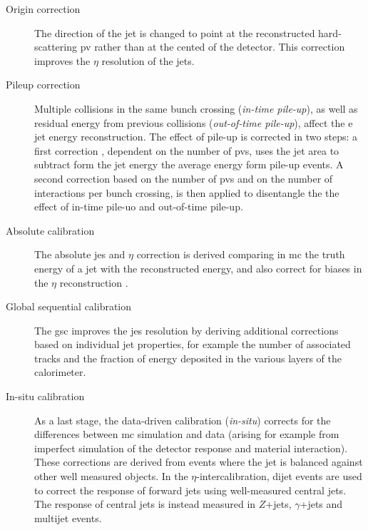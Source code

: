 \begin{description}
\item[Origin correction] The direction of the jet is changed to point at the reconstructed hard-scattering \gls{pv} rather than at the cented of the detector. This correction improves the $\eta$ resolution of the jets.

\item[Pileup correction] Multiple collisions in the same bunch crossing (\textit{in-time pile-up}), as well as residual energy from previous collisions (\textit{out-of-time pile-up}), affect the e jet energy reconstruction. The effect of pile-up is corrected in two steps: a first correction \cite{Cacciari:2007fd,TheATLAScollaboration:2013pia}, dependent on the number of \glspl{pv}, uses the jet area to subtract form the jet energy the average energy form pile-up events. A second correction based on the number of \glspl{pv} and on the number of interactions per bunch crossing, is then applied to disentangle the the effect of in-time pile-uo and out-of-time pile-up.

\item[Absolute calibration] The absolute \gls{jes} and $\eta$ correction is derived comparing in \gls{mc} the truth energy of a jet with the reconstructed energy, and also correct for biases in the $\eta$ reconstruction \cite{Aad2015jets}.

\item[Global sequential calibration] The \gls{gsc} \cite{ATLAS:2015oia} improves the \gls{jes} resolution by deriving additional corrections based on individual jet properties, for example the number of associated tracks and the fraction of energy deposited in the various layers of the calorimeter.

\item[In-situ calibration] As a last stage, the data-driven calibration (\textit{in-situ}) \cite{ATLAS:2015uwa} corrects for the differences between \gls{mc} simulation and data (arising for example from imperfect simulation of the detector response and material interaction). These corrections are derived from events where the jet \pt is balanced against other well measured objects. In the $\eta$-intercalibration, dijet events are used to correct the response of forward jets using well-measured central jets. The response of central jets is instead measured in $Z$+jets, $\gamma$+jets and multijet events. 
 
\end{description}

